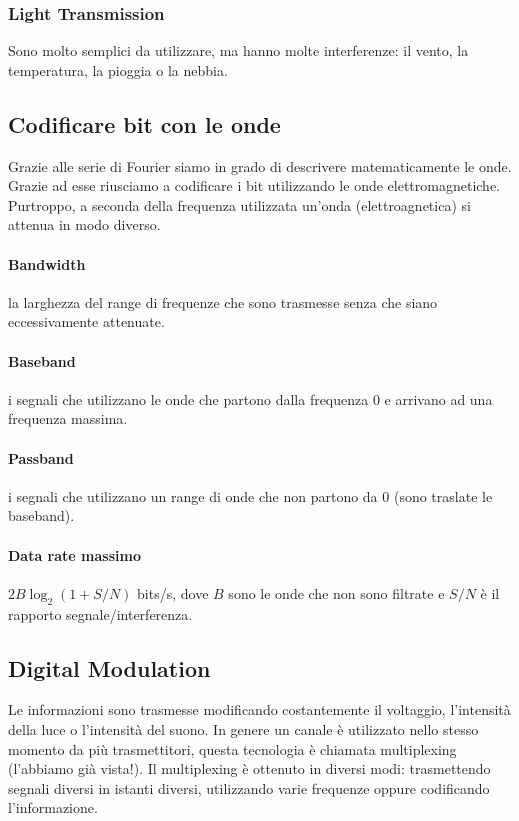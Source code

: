 \documentclass{article}
\begin{document}
\subsubsection{Light Transmission}
Sono molto semplici da utilizzare, ma hanno molte interferenze: il vento, la
temperatura, la pioggia o la nebbia.

\subsection{Codificare bit con le onde}
Grazie alle serie di Fourier siamo in grado di descrivere matematicamente le
onde. Grazie ad esse riusciamo a codificare i bit utilizzando le onde
elettromagnetiche. Purtroppo, a seconda della frequenza utilizzata un'onda
(elettroagnetica) si attenua in modo diverso.

\paragraph{Bandwidth} la larghezza del range di frequenze che sono trasmesse
senza che siano eccessivamente attenuate.

\paragraph{Baseband} i segnali che utilizzano le onde che partono dalla frequenza
0 e arrivano ad una frequenza massima.

\paragraph{Passband} i segnali che utilizzano un range di onde che non partono
da 0 (sono traslate le baseband).

\paragraph{Data rate massimo} $2B\log_2(1+S/N)$ bits/s, dove $B$ sono le onde che non
sono filtrate e $S/N$ è il rapporto segnale/interferenza.

\subsection{Digital Modulation}
Le informazioni sono trasmesse modificando costantemente il voltaggio,
l'intensità della luce o l'intensità del suono. In genere un canale è utilizzato
nello stesso momento da più trasmettitori, questa tecnologia è chiamata
multiplexing (l'abbiamo già vista!). Il multiplexing è ottenuto in diversi modi:
trasmettendo segnali diversi in istanti diversi, utilizzando varie frequenze
oppure codificando l'informazione.
\end{document}

